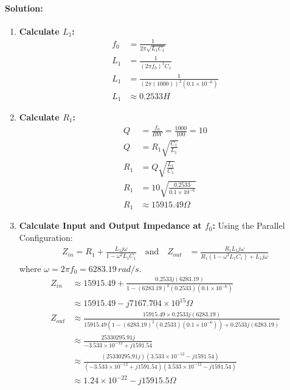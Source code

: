 \paragraph{Solution:}
\begin{enumerate}
  \item \textbf{Calculate \(L_1\):}
    \begin{align*}
      f_0 &= \frac{1}{2\pi\sqrt{L_1 C_1}} \\
      L_1 &= \frac{1}{(2\pi f_0)^2 C_1} \\
      L_1 &= \frac{1}{(2\pi (1000))^2 (0.1 \times 10^{-6})} \\
      L_1 &\approx 0.2533 H
    \end{align*}
  \item \textbf{Calculate \(R_1\):}
    \begin{align*}
      Q &= \frac{f_0}{BW} = \frac{1000}{100} = 10 \\
      Q &= R_1 \sqrt{\frac{C_1}{L_1}} \\
      R_1 &= Q \sqrt{\frac{L_1}{C_1}} \\
      R_1 &= 10 \sqrt{\frac{0.2533}{0.1 \times 10^{-6}}} \\
      R_1 &\approx 15915.49 \Omega
    \end{align*}
  \item \textbf{Calculate Input and Output Impedance at \(f_0\):}
    Using the Parallel Configuration:
    \begin{align*}
      Z_{in} = R_1 + \frac{L_1 j \omega}{1 - \omega^2 L_1 C_1}
      \quad \text{and} \quad
      Z_{out} &= \frac{R_1 L_1 j \omega}{R_1(1 - \omega^2 L_1 C_1) + L_1 j \omega}
    \end{align*}
    where \(\omega = 2 \pi f_0 = 6283.19 \, rad/s\).
    \begin{align*}
      Z_{in} &\approx 15915.49 + \frac{0.2533 j (6283.19)}{1 - (6283.19)^2 (0.2533)(0.1 \times 10^{-6})} \\
              &\approx 15915.49 - j 7167.704 \times 10^{15} \Omega \\
      Z_{out} &\approx \frac{15915.49 \times 0.2533 j (6283.19)}{15915.49(1 - (6283.19)^2 (0.2533)(0.1 \times 10^{-6})) + 0.2533 j (6283.19)} \\
              &\approx \frac{25330295.91 j}{-3.533 \times 10^{-12} + j 1591.54} \\
              &\approx \frac{(25330295.91 j)(3.533 \times 10^{-12} - j 1591.54)}{(-3.533 \times 10^{-12} + j 1591.54)(3.533 \times 10^{-12} - j 1591.54)} \\
              &\approx 1.24 \times 10^{-22} - j 15915.5 \Omega
    \end{align*}
\end{enumerate}

